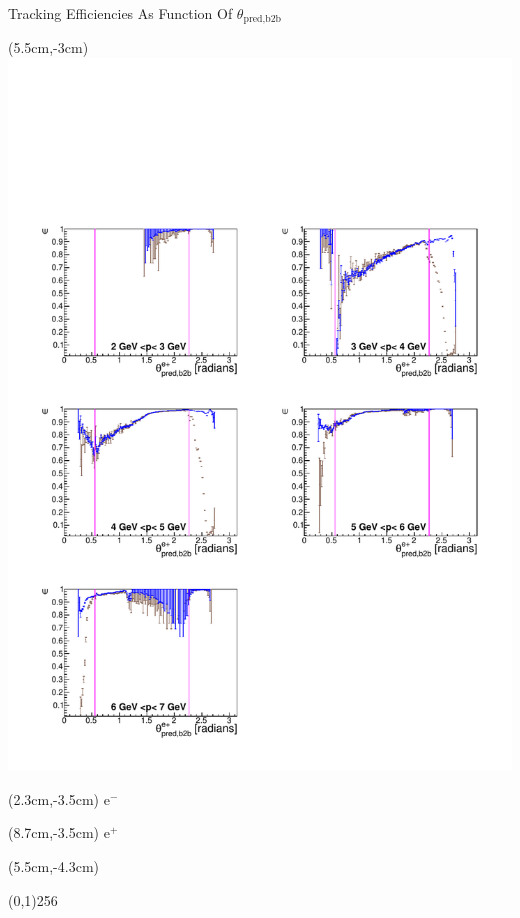 \documentclass[8pt]{beamer}
\begin{document}
\begin{frame}{Tracking Efficiencies As Function Of $\theta_{\textrm{pred,b2b}}$}
\begin{textblock*}{6.5cm}(5.5cm,-3cm)
	\includegraphics[width=\textwidth]{VPlots/Comp/cMThetaep_Data}
\end{textblock*}


\begin{textblock*}{2cm}(2.3cm,-3.5cm)
	$\textrm{e}^-$
\end{textblock*}

\begin{textblock*}{2cm}(8.7cm,-3.5cm)
	$\textrm{e}^+$
\end{textblock*}



\begin{textblock*}{11cm}(5.5cm,-4.3cm)
	
	\begin{center}
		\line(0,1){256}
	\end{center}
	

\end{textblock*}
\end{frame}
\end{document}
